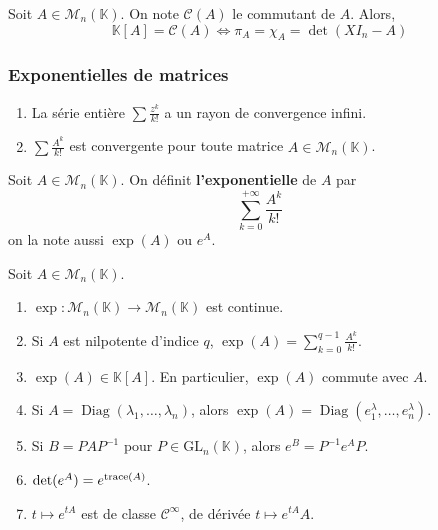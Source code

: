   \begin{application}
    Soit $A \in \mathcal{M}_n(\mathbb{K})$. On note $\mathcal{C}(A)$ le commutant de $A$. Alors,
    \[ \mathbb{K}[A] = \mathcal{C}(A) \iff \pi_A = \chi_A = \det(XI_n - A) \]
  \end{application}

  \subsubsection{Exponentielles de matrices}


  \begin{lemma}
    \begin{enumerate}[label={\bfseries(\roman*)}]
      \item La série entière $\sum \frac{z^k}{k!}$ a un rayon de convergence infini.
      \item $\sum \frac{A^k}{k!}$ est convergente pour toute matrice $A \in \mathcal{M}_n(\mathbb{K})$.
    \end{enumerate}
  \end{lemma}

  \begin{definition}
    Soit $A \in \mathcal{M}_n(\mathbb{K})$. On définit \textbf{l'exponentielle} de $A$ par
    \[ \sum_{k=0}^{+\infty} \frac{A^k}{k!} \]
    on la note aussi $\exp(A)$ ou $e^A$.
  \end{definition}

  \begin{theorem}
    Soit $A \in \mathcal{M}_n(\mathbb{K})$.
    \begin{enumerate}[label={\bfseries(\roman*)}]
      \item $\exp : \mathcal{M}_n(\mathbb{K}) \rightarrow \mathcal{M}_n(\mathbb{K})$ est continue.
      \item Si $A$ est nilpotente d'indice $q$, $\exp(A) = \sum_{k=0}^{q-1} \frac{A^k}{k!}$.
      \item $\exp(A) \in \mathbb{K}[A]$. En particulier, $\exp(A)$ commute avec $A$.
      \item Si $A = \operatorname{Diag}(\lambda_1, \dots, \lambda_n)$, alors $\exp(A) = \operatorname{Diag}(e^\lambda_1, \dots, e^\lambda_n)$.
      \item Si $B = PAP^{-1}$ pour $P \in \mathrm{GL}_n(\mathbb{K})$, alors $e^B = P^{-1} e^A P$.
      \item $\det(e^A) = e^{\operatorname{trace}(A)}$.
      \item $t \mapsto e^{tA}$ est de classe $\mathcal{C}^\infty$, de dérivée $t \mapsto e^{tA}A$.
    \end{enumerate}
  \end{theorem}

